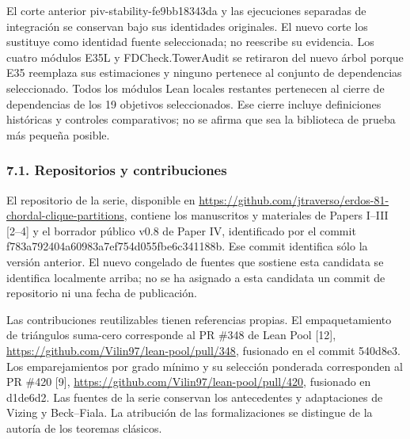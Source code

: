 \documentclass[spanish,11pt,a4paper]{article}
\begin{document}
El corte anterior {\ttfamily\small piv-\discretionary{\hbox{\ensuremath{\hookrightarrow}}}{}{}stability-\discretionary{\hbox{\ensuremath{\hookrightarrow}}}{}{}fe9bb18343da} y las ejecuciones separadas de integración se conservan bajo sus identidades originales. El nuevo corte los sustituye como identidad fuente seleccionada; no reescribe su evidencia. Los cuatro módulos E35L y FDCheck.TowerAudit se retiraron del nuevo árbol porque E35 reemplaza sus estimaciones y ninguno pertenece al conjunto de dependencias seleccionado. Todos los módulos Lean locales restantes pertenecen al cierre de dependencias de los 19 objetivos seleccionados. Ese cierre incluye definiciones históricas y controles comparativos; no se afirma que sea la biblioteca de prueba más pequeña posible.

\subsubsection{7.1. Repositorios y contribuciones}\label{repositorios-y-contribuciones}

El repositorio de la serie, disponible en \url{https://github.com/jtraverso/erdos-81-chordal-clique-partitions}, contiene los manuscritos y materiales de Papers I--III {[}2--4{]} y el borrador público v0.8 de Paper IV, identificado por el commit {\ttfamily\small f783a792404a\discretionary{\hbox{\ensuremath{\hookrightarrow}}}{}{}60983a7ef754\discretionary{\hbox{\ensuremath{\hookrightarrow}}}{}{}d055fbe6c341\discretionary{\hbox{\ensuremath{\hookrightarrow}}}{}{}188b}. Ese commit identifica sólo la versión anterior. El nuevo congelado de fuentes que sostiene esta candidata se identifica localmente arriba; no se ha asignado a esta candidata un commit de repositorio ni una fecha de publicación.

Las contribuciones reutilizables tienen referencias propias. El empaquetamiento de triángulos suma-cero corresponde al PR \#348 de Lean Pool {[}12{]}, \url{https://github.com/Vilin97/lean-pool/pull/348}, fusionado en el commit {\ttfamily\small 540d8e3}. Los emparejamientos por grado mínimo y su selección ponderada corresponden al PR \#420 {[}9{]}, \url{https://github.com/Vilin97/lean-pool/pull/420}, fusionado en {\ttfamily\small d1de6d2}. Las fuentes de la serie conservan los antecedentes y adaptaciones de Vizing y Beck--Fiala. La atribución de las formalizaciones se distingue de la autoría de los teoremas clásicos.
\end{document}
